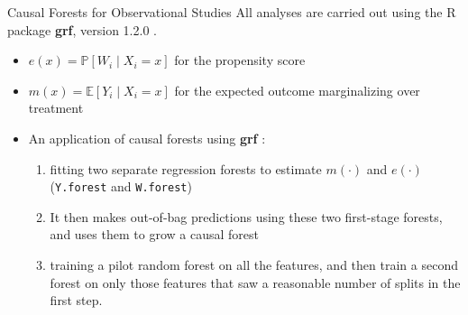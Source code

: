 \documentclass[mathserif, xcolor=table]{beamer}
\begin{document}
\begin{frame}{Causal Forests for Observational Studies}
All analyses are carried out using the R package \textbf{grf}, version 1.2.0 \citep{tibshirani2018package}.
\begin{itemize}
    \item $e(x) = \mathbb{P}[W_i\mid X_i = x]$ for the propensity score 
    \item $m(x) = \mathbb{E}[Y_i\mid X_i = x]$ for the expected outcome marginalizing over treatment
    \item An application of causal forests using \textbf{grf} \citep{athey2019estimating}: 
    \begin{enumerate}
        \item fitting two separate regression forests to estimate $m(\cdot)$ and $e(\cdot)$ (\texttt{Y.forest} and \texttt{W.forest})
        \item It then makes out-of-bag predictions using these two first-stage forests, and uses them to grow a causal forest
        \item training a pilot random forest on all the features, and then train a second forest on only those features that saw a reasonable number of splits in the first step.
    \end{enumerate}
    \end{itemize}
\end{frame}
\end{document}
